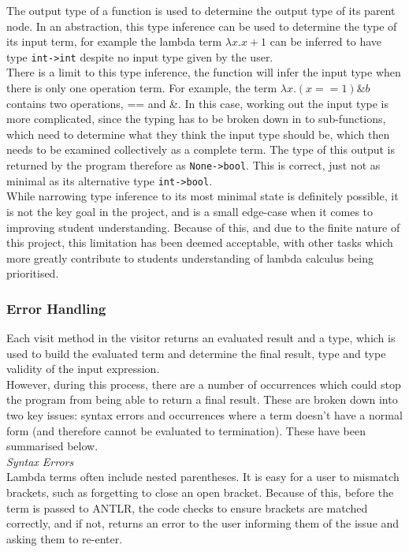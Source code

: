 \documentclass[a4paper,11pt]{report}
\begin{document}
The output type of a function is used to determine the output type of its parent node. In an abstraction, this type inference can be used to determine the type of its input term, for example the lambda term $\lambda x.x+1$ can be inferred to have type \texttt{int->int} despite no input type given by the user.\\

There is a limit to this type inference, the function will infer the input type when there is only one operation term. For example, the term $\lambda x.(x==1)\&b$ contains two operations, == and \&. In this case, working out the input type is more complicated, since the typing has to be broken down in to sub-functions, which need to determine what they think the input type should be, which then needs to be examined collectively as a complete term. The type of this output is returned by the program therefore as \texttt{None->bool}. This is correct, just not as minimal as its alternative type \texttt{int->bool}.\\

While narrowing type inference to its most minimal state is definitely possible, it is not the key goal in the project, and is a small edge-case when it comes to improving student understanding. Because of this, and due to the finite nature of this project, this limitation has been deemed acceptable, with other tasks which more greatly contribute to students understanding of lambda calculus being prioritised.

\subsubsection{Error Handling}
Each visit method in the visitor returns an evaluated result and a type, which is used to build the evaluated term and determine the final result, type and type validity of the input expression.\\

However, during this process, there are a number of occurrences which could stop the program from being able to return a final result. These are broken down into two key issues: syntax errors and occurrences where a term doesn't have a normal form (and therefore cannot be evaluated to termination). These have been summarised below.\\

\textit{Syntax Errors}\\
Lambda terms often include nested parentheses. It is easy for a user to mismatch brackets, such as forgetting to close an open bracket. Because of this, before the term is passed to ANTLR, the code checks to ensure brackets are matched correctly, and if not, returns an error to the user informing them of the issue and asking them to re-enter.
\end{document}
